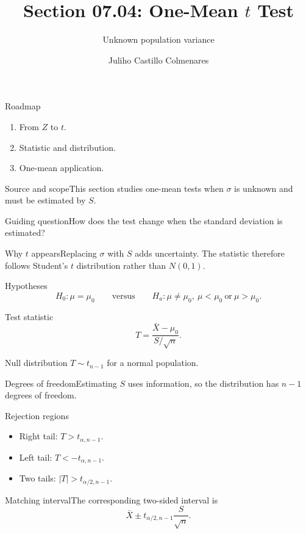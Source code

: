 \documentclass[10pt,aspectratio=169]{beamer}
\title[One-mean $t$ test]{Section 07.04: One-Mean $t$ Test}\subtitle{Unknown population variance}
\author[J. Castillo Colmenares]{Juliho Castillo Colmenares}\institute{Tecnológico de Monterrey}\date{}
\begin{document}
\begin{frame}[plain]\titlepage\end{frame}
\begin{frame}{Roadmap}\small\begin{enumerate}\item From $Z$ to $t$.\item Statistic and distribution.\item One-mean application.\end{enumerate}\end{frame}
\begin{frame}{Source and scope}\small This section studies one-mean tests when $\sigma$ is unknown and must be estimated by $S$.\begin{block}{Guiding question}How does the test change when the standard deviation is estimated?\end{block}\end{frame}
\begin{frame}{Why $t$ appears}\small Replacing $\sigma$ with $S$ adds uncertainty. The statistic therefore follows Student's $t$ distribution rather than $N(0,1)$.\end{frame}
\begin{frame}{Hypotheses}\small\[H_0:\mu=\mu_0\qquad\text{versus}\qquad H_a:\mu\neq\mu_0,\ \mu<\mu_0\ \text{or}\ \mu>\mu_0.\]\end{frame}
\begin{frame}{Test statistic}\small\[T=\frac{\bar X-\mu_0}{S/\sqrt n}.\]\begin{block}{Null distribution} $T\sim t_{n-1}$ for a normal population.\end{block}\end{frame}
\begin{frame}{Degrees of freedom}\small Estimating $S$ uses information, so the distribution has $n-1$ degrees of freedom.\end{frame}
\begin{frame}{Rejection regions}\small\begin{itemize}\item Right tail: $T>t_{\alpha,n-1}$.\item Left tail: $T<-t_{\alpha,n-1}$.\item Two tails: $|T|>t_{\alpha/2,n-1}$.\end{itemize}\end{frame}
\begin{frame}{Matching interval}\small The corresponding two-sided interval is\[\bar X\pm t_{\alpha/2,n-1}\frac{S}{\sqrt n}.\]\end{frame}
\end{document}

